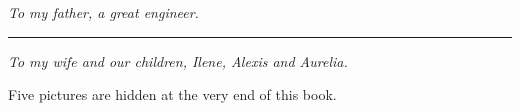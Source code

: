 \cleardoublepage
\thispagestyle{empty}
\vspace*{5.2cm}
\begin{center}
{\Large\itshape To my father, a great engineer.}\par
\vspace{1.3cm}
{\color{okorange}\rule{1.6cm}{1pt}}\par
\vspace{1.3cm}
{\Large\itshape To my wife and our children, Ilene, Alexis and Aurelia.}\par
\vspace*{\fill}
{\footnotesize\color{encre!70}Five pictures are hidden at the very end of this book.}\par
\vspace{1.2cm}
\end{center}
\clearpage
